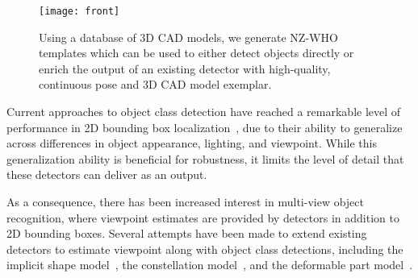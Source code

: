 \begin{figure}[t]
  \centering
  \texttt{[image: front]} %
  \caption{Using a database of 3D CAD models, we generate NZ-WHO
    templates which can be used to either detect objects directly or
    enrich the output of an existing detector with high-quality,
    continuous pose and 3D CAD model exemplar.}
  \label{fig:front}
\end{figure}
 

Current approaches to object class detection have reached a remarkable
level of performance in 2D bounding box
localization~\cite{pascal12, Felzenszwalb10, Overfeat, Krizhevsky12, Girshick14}, due to their
ability to generalize across differences in object appearance,
lighting, and viewpoint. While this generalization
ability is beneficial for robustness, it limits
the level of detail that these detectors can deliver as an output.

As a consequence, there has been increased interest in multi-view object
recognition, where viewpoint estimates are provided by
detectors in addition to 2D bounding boxes. Several attempts have been
made to extend existing detectors to estimate viewpoint along with object class
detections, including the implicit shape model~\cite{sun10eccv}, the
constellation model~\cite{stark10bmvc}, and the
deformable part model~\cite{Felzenszwalb10, gu10eccv,Xiang12,Pepik12,Fidler12,Hejrati14}.

